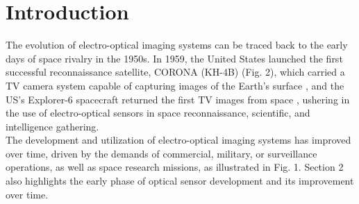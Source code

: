 \documentclass[final,5p,times,twocolumn]{elsarticle}
\begin{document}
\section{Introduction}
\label{}
The evolution of electro-optical imaging systems can be traced back to the early days of space rivalry in the 1950s. In 1959, the United States launched the first successful reconnaissance satellite, CORONA (KH-4B) (Fig. 2), which carried a TV camera system capable of capturing images of the Earth's surface \citep{ruffner1995corona}, and the US's Explorer-6 spacecraft returned the first TV images from space \citep{christopherson20192019, judge1962observations}, ushering in the use of electro-optical sensors in space reconnaissance, scientific, and intelligence gathering.\\
The development and utilization of electro-optical imaging systems has improved over time, driven by the demands of commercial, military, or surveillance operations, as well as space research missions, as illustrated in Fig. 1. Section 2 also highlights the early phase of optical sensor development and its improvement over time.
\end{document}
